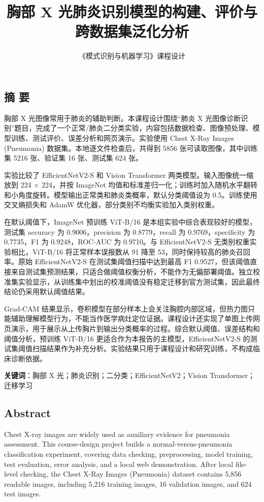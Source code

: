 \documentclass[
]{ctexart}
\title{胸部 X 光肺炎识别模型的构建、评价与跨数据集泛化分析}
\subtitle{《模式识别与机器学习》课程设计}
\author{}
\date{}
\begin{document}
\maketitle

\hypertarget{ux6458-ux8981}{%
\subsection{摘 要}\label{ux6458-ux8981}}

胸部 X 光图像常用于肺炎的辅助判断。本课程设计围绕``肺炎 X
光图像诊断识别''题目，完成了一个正常/肺炎二分类实验，内容包括数据检查、图像预处理、模型训练、测试评价、误差分析和网页演示。实验使用
Chest X-Ray Images (Pneumonia) 数据集。本地逐文件检查后，共得到 5856
张可读取图像，其中训练集 5216 张、验证集 16 张、测试集 624 张。

实验比较了 EfficientNetV2-S 和 Vision Transformer
两类模型。输入图像统一缩放到 224 × 224，并按 ImageNet
均值和标准差归一化；训练时加入随机水平翻转和小角度旋转。模型输出正常类和肺炎类概率，默认分类阈值设为
0.5。训练使用交叉熵损失和 AdamW 优化器，部分类别不均衡实验加入类别权重。

在默认阈值下，ImageNet 预训练 ViT-B/16
是本组实验中综合表现较好的模型，测试集 accuracy 为 0.9006，precision 为
0.8779，recall 为 0.9769，specificity 为 0.7735，F1 为 0.9248，ROC-AUC
为 0.9710。与 EfficientNetV2-S 无类别权重实验相比，ViT-B/16
将正常样本误报数从 91 降至 53，同时保持较高的肺炎召回率。原始
EfficientNetV2-S 在测试集阈值扫描中达到最高 F1
0.9527，但该阈值直接来自测试集预测结果，只适合做阈值权衡分析，不能作为无偏部署阈值。独立校准集实验显示，从训练集中划出的校准阈值没有稳定迁移到官方测试集，因此最终结论仍采用默认阈值结果。

Grad-CAM
结果显示，卷积模型在部分样本上会关注胸腔内部区域，但热力图只能辅助理解模型行为，不能当作医学病灶定位证据。课程设计还实现了单图上传网页演示，用于展示从上传胸片到输出分类概率的过程。综合默认阈值、误差结构和阈值分析，预训练
ViT-B/16 更适合作为本报告的主模型，EfficientNetV2-S
的测试集阈值扫描结果作为补充分析。实验结果只用于课程设计和研究训练，不构成临床诊断依据。

\textbf{关键词}：胸部 X 光；肺炎识别；二分类；EfficientNetV2；Vision
Transformer；迁移学习

\hypertarget{abstract}{%
\subsection{Abstract}\label{abstract}}

Chest X-ray images are widely used as auxiliary evidence for pneumonia
assessment. This course-design project builds a normal-versus-pneumonia
classification experiment, covering data checking, preprocessing, model
training, test evaluation, error analysis, and a local web
demonstration. After local file-level checking, the Chest X-Ray Images
(Pneumonia) dataset contains 5,856 readable images, including 5,216
training images, 16 validation images, and 624 test images.
\end{document}
